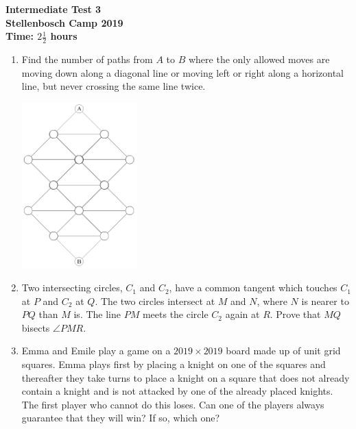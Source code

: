 \documentclass{article}
\begin{document}
	\thispagestyle{empty}
	
	\begin{center}
		\textbf{\Large Intermediate Test 3}
		\\ \vspace{1em}
		\textbf{\large Stellenbosch Camp 2019}
		\\ \vspace{1em}
		\textbf{\large Time: $2\frac{1}{2}$ hours}
	\end{center}
	
	\vspace{6.81mm}
	
	\begin{enumerate}[1.]
		\item %
		Find the number of paths from $A$ to $B$ where the only allowed moves are moving down along a diagonal line or moving left or right along a horizontal line, but never crossing the same line twice.
		
		\begin{center}
			\includegraphics[width=0.35\textwidth]{test_3_q_1}
		\end{center}
		\vspace{6.81mm}

		\item %
		Two intersecting circles, $C_1$ and $C_2$, have a common tangent which touches $C_1$ at $P$ and $C_2$ at $Q$. The two circles intersect at $M$ and $N$, where $N$ is nearer to $PQ$ than $M$ is. The line $PM$ meets the circle $C_2$ again at $R$. Prove that $MQ$ bisects $\angle PMR$.
		\vspace{6.81mm}

		\item %
		Emma and Emile play a game on a $2019 \times 2019$ board made up of unit grid squares. Emma plays first by placing a knight on one of the squares and thereafter they take turns to place a knight on a square that does not already contain a knight and is not attacked by one of the already placed knights. The first player who cannot do this loses. Can one of the players always guarantee that they will win? If so, which one? 
		\vspace{6.81mm}
		

\end{enumerate}
\end{document}
